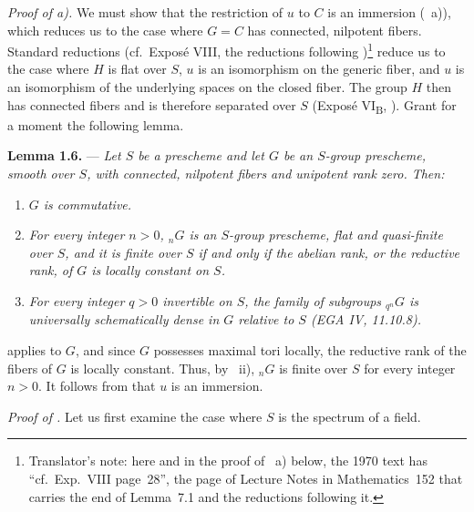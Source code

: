\smallskip
\noindent\textit{Proof of  a).}
We must show that the restriction of \(u\) to \(C\) is an immersion
(~a)), which reduces us to the case where \(G=C\) has connected,
nilpotent fibers. Standard reductions (cf.\ Exposé VIII, the reductions following
)\footnote{Translator's note: here and in the proof of
~a) below, the 1970 text has ``cf.\ Exp.~VIII page~28'', the
page of Lecture Notes in Mathematics~152 that carries the end of Lemma~7.1 and the reductions
following it.} reduce us to the case where \(H\) is flat over \(S\), \(u\) is
an isomorphism on the generic fiber, and \(u\) is an isomorphism of
the underlying spaces on the closed fiber. The group \(H\) then has
connected fibers and is therefore separated over \(S\) (Exposé
VI\textsubscript{B}, ). Grant for a moment the following lemma.

\medskip
\noindent{}%
\textbf{Lemma 1.6.} --- \textit{Let \(S\) be a prescheme and let
\(G\) be an \(S\)-group prescheme, smooth over \(S\), with connected,
nilpotent fibers and unipotent rank zero. Then:}
\begin{enumerate}
\item[\textit{i)}] \textit{\(G\) is commutative.}
\item[\textit{ii)}] \textit{For every integer \(n>0\),
\({}_{n}G\) is an \(S\)-group prescheme, flat and quasi-finite over
\(S\), and it is finite over \(S\) if and only if the abelian rank,
or the reductive rank, of \(G\) is locally constant on \(S\).}
\item[\textit{iii)}] \textit{For every integer \(q>0\) invertible on
\(S\), the family of subgroups \({}_{q^n}G\) is universally
schematically dense in \(G\) relative to \(S\) (EGA IV, 11.10.8).}
\end{enumerate}

 applies to \(G\), and since \(G\) possesses maximal tori
locally, the reductive rank of the fibers of \(G\) is locally
constant. Thus, by ~ii), \({}_{n}G\) is finite over \(S\) for
every integer \(n>0\). It follows from  that \(u\) is
an immersion.

\medskip
\noindent\textit{Proof of .}
Let us first examine the case where \(S\) is the spectrum of a field.

